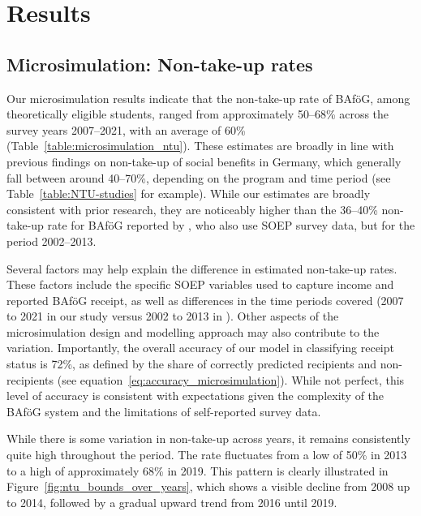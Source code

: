 %
%

\section{Results}

\subsection{Microsimulation: Non-take-up rates}

Our microsimulation results indicate that the non-take-up rate of BAföG, among theoretically eligible students, ranged from approximately 50--68\% across the survey years 2007--2021, with an average of 60\% (Table~\ref{table:microsimulation_ntu}). These estimates are broadly in line with previous findings on non-take-up of social benefits in Germany, which generally fall between around 40--70\%, depending on the program and time period (see Table~\ref{table:NTU-studies} for example). While our estimates are broadly consistent with prior research, they are noticeably higher than the 36--40\% non-take-up rate for BAföG reported by \cite{herber_non-take-up_2019}, who also use SOEP survey data, but for the period 2002--2013.

Several factors may help explain the difference in estimated non-take-up rates. These factors include the specific SOEP variables used to capture income and reported BAföG receipt, as well as differences in the time periods covered (2007 to 2021 in our study versus 2002 to 2013 in \cite{herber_non-take-up_2019}). Other aspects of the microsimulation design and modelling approach may also contribute to the variation. Importantly, the overall accuracy of our model in classifying receipt status is 72\%, as defined by the share of correctly predicted recipients and non-recipients (see equation~\ref{eq:accuracy_microsimulation}). While not perfect, this level of accuracy is consistent with expectations given the complexity of the BAföG system and the limitations of self-reported survey data.




While there is some variation in non-take-up across years, it remains consistently quite high throughout the period. 
The rate fluctuates from a low of 50\% in 2013 to a high of approximately 68\% in 2019. 
This pattern is clearly illustrated in Figure~\ref{fig:ntu_bounds_over_years}, which shows a visible decline from 2008 up to 2014, followed by a gradual upward trend from 2016 until 2019. 

